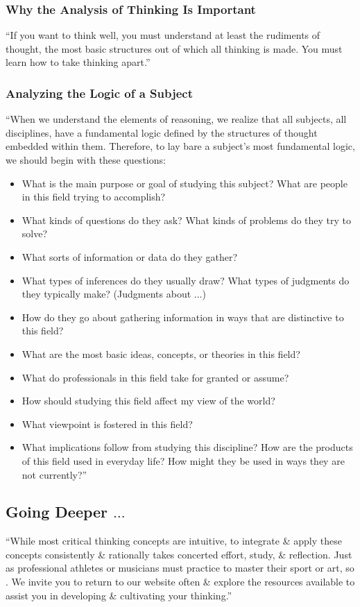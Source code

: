 \documentclass[oneside]{book}
\numberwithin{equation}{section}
\begin{document}
\subsubsection{Why the Analysis of Thinking Is Important}
``If you want to think well, you must understand at least the rudiments of thought, the most basic structures out of which all thinking is made. You must learn how to take thinking apart.''

\subsubsection{Analyzing the Logic of a Subject}
``When we understand the elements of reasoning, we realize that all subjects, all disciplines, have a fundamental logic defined by the structures of thought embedded within them. Therefore, to lay bare a subject's most fundamental logic, we should begin with these questions:
\begin{itemize}
	\item What is the main purpose or goal of studying this subject? What are people in this field trying to accomplish?
	\item What kinds of questions do they ask? What kinds of problems do they try to solve?
	\item What sorts of information or data do they gather?
	\item What types of inferences do they usually draw? What types of judgments do they typically make? (Judgments about $\ldots$)
	\item How do they go about gathering information in ways that are distinctive to this field?
	\item What are the most basic ideas, concepts, or theories in this field?
	\item What do professionals in this field take for granted or assume?
	\item How should studying this field affect my view of the world?
	\item What viewpoint is fostered in this field?
	\item What implications follow from studying this discipline? How are the products of this field used in everyday life? How might they be used in ways they are not currently?''
\end{itemize}

\subsection{Going Deeper $\ldots$}
``While most critical thinking concepts are intuitive, to integrate \& apply these concepts consistently \& rationally takes concerted effort, study, \& reflection. Just as professional athletes or musicians must practice to master their sport or art, so . We invite you to return to our website often \& explore the resources available to assist you in developing \& cultivating your thinking.''
\end{document}
